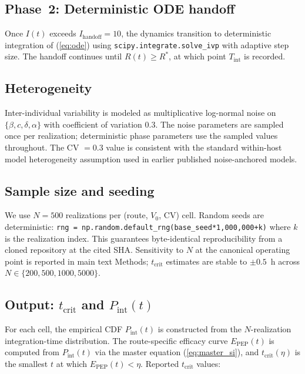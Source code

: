 \documentclass[11pt]{article}
\theoremstyle{definition}
\theoremstyle{remark}
\newcommand{\Tint}{T_{\text{int}}}
\newcommand{\Pint}{P_{\text{int}}}
\newcommand{\Epep}{E_{\text{PEP}}}
\newcommand{\tcrit}{t_{\text{crit}}}
\begin{document}
\subsection{Phase~2: Deterministic ODE handoff}

Once $I(t)$ exceeds $I_{\text{handoff}} = 10$, the dynamics transition to deterministic integration of (\ref{eq:ode}) using \texttt{scipy.integrate.solve\_ivp} with adaptive step size. The handoff continues until $R(t) \geq R^{*}$, at which point $\Tint$ is recorded.

\subsection{Heterogeneity}

Inter-individual variability is modeled as multiplicative log-normal noise on $\{\beta, c, \delta, \alpha\}$ with coefficient of variation $0.3$. The noise parameters are sampled once per realization; deterministic phase parameters use the sampled values throughout. The CV $= 0.3$ value is consistent with the standard within-host model heterogeneity assumption used in earlier published noise-anchored models.

\subsection{Sample size and seeding}

We use $N = 500$ realizations per (route, $V_{0}$, CV) cell. Random seeds are deterministic: \texttt{rng = np.random.default\_rng(base\_seed*1{,}000{,}000+k)} where $k$ is the realization index. This guarantees byte-identical reproducibility from a cloned repository at the cited SHA. Sensitivity to $N$ at the canonical operating point is reported in main text Methods; $\tcrit$ estimates are stable to $\pm 0.5$~h across $N \in \{200, 500, 1000, 5000\}$.

\subsection{Output: \texorpdfstring{$\tcrit$}{tcrit} and \texorpdfstring{$\Pint(t)$}{Pint(t)}}

For each cell, the empirical CDF $\Pint(t)$ is constructed from the $N$-realization integration-time distribution. The route-specific efficacy curve $\Epep(t)$ is computed from $\Pint(t)$ via the master equation (\ref{eq:master_si}), and $\tcrit(\eta)$ is the smallest $t$ at which $\Epep(t) < \eta$. Reported $\tcrit$ values:
\end{document}
